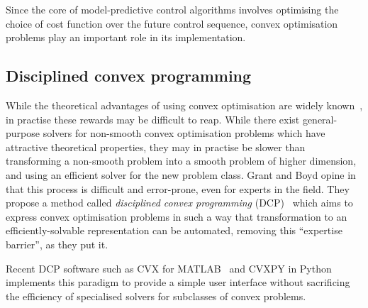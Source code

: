 Since the core of model-predictive control algorithms involves optimising the choice of cost function over the future control sequence, convex optimisation problems play an important role in its implementation.

\subsection{Disciplined convex programming}

While the theoretical advantages of using convex optimisation are widely known~\cite{Luo06}, in practise these rewards may be difficult to reap.
While there exist general-purpose solvers for non-smooth convex optimisation problems which have attractive theoretical properties, they may in practise be slower than transforming a non-smooth problem into a smooth problem of higher dimension, and using an efficient solver for the new problem class.
Grant and Boyd opine in~\cite{Grant08} that this process is difficult and error-prone, even for experts in the field.
They propose a method called \emph{disciplined convex programming} (DCP)~\cite{Grant06} which aims to express convex optimisation problems in such a way that transformation to an efficiently-solvable representation can be automated, removing this ``expertise barrier'', as they put it.

Recent DCP software such as CVX for MATLAB~\cite{CVX} and CVXPY in Python~\cite{CVXPY} implements this paradigm to provide a simple user interface without sacrificing the efficiency of specialised solvers for subclasses of convex problems.

